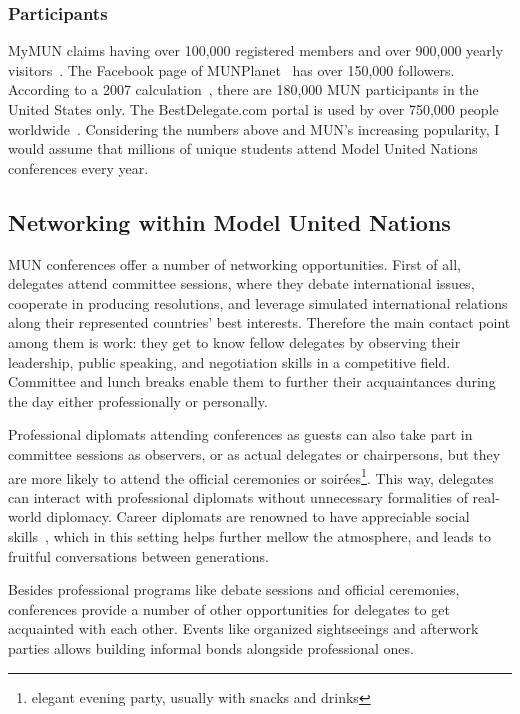 \subsubsection{Participants}

MyMUN claims having over 100,000 registered members and over 900,000 yearly visitors~\cite{mymunwebsite}. The Facebook page of MUNPlanet~\cite{munplanetfacebook} has over 150,000 followers. According to a 2007 calculation~\cite{howbigismun}, there are 180,000 MUN participants in the United States only. The BestDelegate.com portal is used by over 750,000 people worldwide~\cite{bestdelegate-about}. Considering the numbers above and MUN's increasing popularity, I would assume that millions of unique students attend Model United Nations conferences every year.

\subsection{Networking within Model United Nations}

MUN conferences offer a number of networking opportunities. First of all, delegates attend committee sessions, where they debate international issues, cooperate in producing resolutions, and leverage simulated international relations along their represented countries' best interests. Therefore the main contact point among them is work: they get to know fellow delegates by observing their leadership, public speaking, and negotiation skills in a competitive field. Committee and lunch breaks enable them to further their acquaintances during the day either professionally or personally.

Professional diplomats attending conferences as guests can also take part in committee sessions as observers, or as actual delegates or chairpersons, but they are more likely to attend the official ceremonies or soirées\footnote{elegant evening party, usually with snacks and drinks}. This way, delegates can interact with professional diplomats without unnecessary formalities of real-world diplomacy. Career diplomats are renowned to have appreciable social skills~\cite{fsicapabilities}, which in this setting helps further mellow the atmosphere, and leads to fruitful conversations between generations.

Besides professional programs like debate sessions and official ceremonies, conferences provide a number of other opportunities for delegates to get acquainted with each other. Events like organized sightseeings and afterwork parties allows building informal bonds alongside professional ones.

